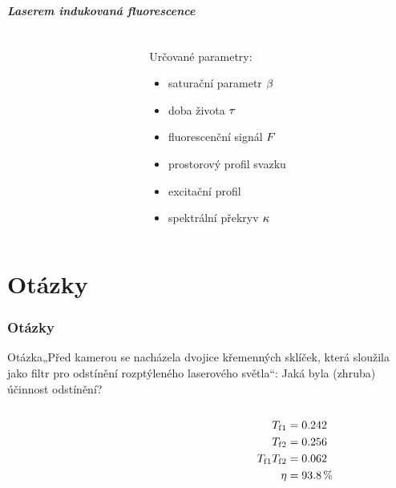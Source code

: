 \documentclass[10pt]{beamer}
\begin{document}
\begin{frame}
	\frametitle{Laserem indukovaná fluorescence}
	\small
	\begin{columns}
	\begin{column}{0.5\textwidth}
		
		
	\end{column}
	\begin{column}{0.5\textwidth}
		Určované parametry:
		\begin{itemize}
			\item saturační parametr $\beta$
			\item doba života $\tau$
			\item fluorescenční signál $F$
			\item prostorový profil svazku
			\item excitační profil
			\item spektrální překryv $\kappa$
		\end{itemize}
	\end{column}
	\end{columns}
\end{frame}

\part{Otázky}
\section{Otázky}
\newcommand\question[1]{\begin{block}{Otázka}#1\end{block}}
\begin{frame}
	\partpage
\end{frame}

\begin{frame}
	\question{„Před kamerou se nacházela dvojice křemenných sklíček, která
		sloužila jako filtr pro odstínění rozptýleného laserového světla“:
		Jaká byla (zhruba) účinnost odstínění?}
	\begin{columns}
	\begin{column}{0.75\textwidth}
		
	\end{column}
	\begin{column}{0.25\textwidth}
		\begin{align*}
			T_\text{f}{}_1 &= \num{0.242} \\
			T_\text{f}{}_2 &= \num{0.256} \\
			T_\text{f}{}_1 T_\text{f}{}_2 &= \num{0.062} \\
			\eta &= \SI{93.8}{\percent}
		\end{align*}
	\end{column}
	\end{columns}
\end{frame}
\end{document}

